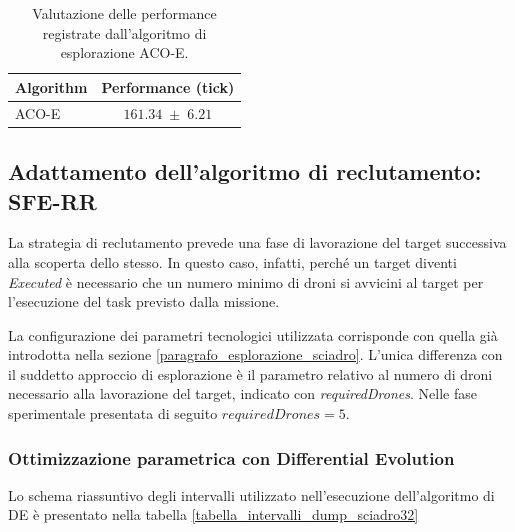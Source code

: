 \begin{table}[H]
    \centering
    \captionsetup{justification=centering, margin=2cm, font=footnotesize}
    \begin{tabular}{|l|c|}
    \hline
    \textbf{Algorithm}              & \textbf{Performance (tick)}              \\ \hline
    ACO-E                & $161.34 \; \pm \; 6.21$           \\ \hline
    \end{tabular}%
    
    \caption{Valutazione delle performance registrate dall'algoritmo di esplorazione ACO-E.}
    \label{tabella_performance_dump_ACO}
\end{table}


\subsection{Adattamento dell'algoritmo di reclutamento: \\SFE-RR}

La strategia di reclutamento prevede una fase di lavorazione del target successiva alla scoperta dello stesso.
In questo caso, infatti, perché un target diventi \textit{Executed} è necessario che un numero minimo di droni si avvicini al target per l'esecuzione del task previsto dalla missione.

La configurazione dei parametri tecnologici utilizzata corrisponde con quella già introdotta nella sezione \ref{paragrafo_esplorazione_sciadro}.
L'unica differenza con il suddetto approccio di esplorazione è il parametro relativo al numero di droni necessario alla lavorazione del target, indicato con \textit{requiredDrones}.
Nelle fase sperimentale presentata di seguito $requiredDrones = 5$.

\subsubsection{Ottimizzazione parametrica con Differential Evolution}

Lo schema riassuntivo degli intervalli utilizzato nell'esecuzione dell'algoritmo di DE è presentato nella tabella \ref{tabella_intervalli_dump_sciadro32}

